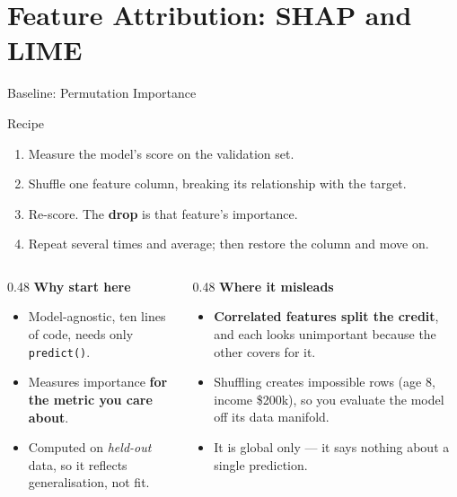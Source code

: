 \section{Feature Attribution: SHAP and LIME}

\begin{frame}{Baseline: Permutation Importance}

    \begin{block}{Recipe}
        \begin{enumerate}
            \item Measure the model's score on the validation set.
            \item Shuffle one feature column, breaking its relationship with the target.
            \item Re-score. The \textbf{drop} is that feature's importance.
            \item Repeat several times and average; then restore the column and move on.
        \end{enumerate}
    \end{block}

    \vspace{0.7em}

    \begin{columns}[T]
        \begin{column}{0.48\textwidth}
            \textbf{Why start here}
            \begin{itemize}\small
                \setlength\itemsep{0.3em}
                \item Model-agnostic, ten lines of code, needs only \texttt{predict()}.
                \item Measures importance \textbf{for the metric you care about}.
                \item Computed on \emph{held-out} data, so it reflects generalisation, not fit.
            \end{itemize}
        \end{column}
        \begin{column}{0.48\textwidth}
            \textbf{Where it misleads}
            \begin{itemize}\small
                \setlength\itemsep{0.3em}
                \item \textbf{Correlated features split the credit}, and each looks unimportant
                      because the other covers for it.
                \item Shuffling creates impossible rows (age 8, income \$200k), so you evaluate
                      the model off its data manifold.
                \item It is global only --- it says nothing about a single prediction.
            \end{itemize}
        \end{column}
    \end{columns}
\end{frame}

